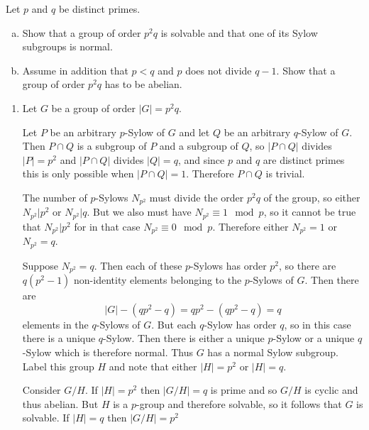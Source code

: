 \documentclass{article}
\newcounter{Problem}
\newenvironment{Problem}{\begin{Exercise}[name={Problem},
                                          counter={Problem}]}
                        {\end{Exercise}}
\begin{document}
\begin{Problem}
Let $p$ and $q$ be distinct primes.
\begin{enumerate}[(a)]
  \item{
    Show that a group of order $p^2 q$ is solvable and that one of its
    Sylow subgroups is normal.
  }
  \item{
    Assume in addition that $p < q$ and $p$ does not divide $q -
    1$. Show that a group of order $p^2 q$ has to be abelian.
  }
\end{enumerate}
\end{Problem}

\begin{Answer}
\begin{enumerate}
  \item{
    Let $G$ be a group of order $|G| = p^2 q$.

    Let $P$ be an arbitrary $p$-Sylow of $G$ and let $Q$ be an
    arbitrary $q$-Sylow of $G$. Then $P \cap Q$ is a subgroup of $P$
    and a subgroup of $Q$, so $|P \cap Q|$ divides $|P| = p^2$ and
    $|P \cap Q|$ divides $|Q| = q$, and since $p$ and $q$ are distinct
    primes this is only possible when $|P \cap Q| = 1$. Therefore $P
    \cap Q$ is trivial.

    The number of $p$-Sylows $N_{p^2}$ must divide the order $p^2q$ of the
    group, so either $N_{p^2} \vert p^2$ or $N_{p^2} \vert q$. But
    we also must have $N_{p^2} \equiv 1 \mod p$, so it cannot be true
    that $N_{p^2} \vert p^2$ for in that case $N_{p^2} \equiv 0 \mod
    p$. Therefore either $N_{p^2} = 1$ or $N_{p^2} = q$.

    Suppose $N_{p^2} = q$. Then each of these $p$-Sylows has order
    $p^2$, so there are $q (p^2 - 1)$ non-identity elements belonging
    to the $p$-Sylows of $G$. Then there are
    $$
    |G| - (qp^2 - q) = qp^2 - (qp^2 - q) = q
    $$
    elements in the $q$-Sylows of $G$. But each $q$-Sylow has order
    $q$, so in this case there is a unique $q$-Sylow. Then there
    is either a unique $p$-Sylow or a unique $q$-Sylow which is
    therefore normal. Thus $G$ has a normal Sylow subgroup.
    Label this group $H$ and note that either $|H| = p^2$ or
    $|H| = q$.

    Consider $G / H$. If $|H| = p^2$ then $|G / H| = q$ is prime and
    so $G / H$ is cyclic and thus abelian. But $H$ is a $p$-group and
    therefore solvable, so it follows that $G$ is solvable. If
    $|H| = q$ then $|G / H| = p^2$
  }
\end{enumerate}
\end{Answer}
\end{document}
